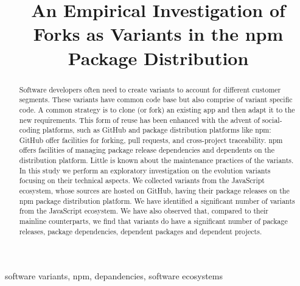 \documentclass[conference]{IEEEtran}
\newcommand{\gh}{\textsf{GitHub}\xspace}
\newcommand{\np}{\textsf{npm}\xspace}
\newcommand{\js}{\textsf{JavaScript}\xspace}
\newcommand{\npm}{{the \np package distribution platform}\xspace}
\begin{document}
\title{An Empirical Investigation of Forks as Variants in the npm Package Distribution}


\author{
	}



\maketitle

\begin{abstract}
Software developers often need to create variants to account for different customer segments. These variants have common code base but also comprise of variant specific code. A common strategy is to clone (or fork) an existing app and then adapt it to the new requirements. This form of reuse has been enhanced with the advent of social-coding platforms, such as \gh and package distribution platforms like \np: \gh offer facilities for forking, pull requests, and cross-project traceability. \np offers facilities of managing package release dependencies and dependents on the distribution platform. Little is known about the maintenance practices of the variants.
In this study we perform an exploratory investigation on the evolution variants focusing on their technical aspects. We collected variants from the \js ecosystem, whose sources are hosted on \gh, having their package releases on \npm. We have identified a significant number of variants from the \js ecosystem. We have also observed that, compared to their mainline counterparts, we find that variants do have a significant number of package releases, package dependencies, dependent packages and dependent projects.

\end{abstract}

\begin{IEEEkeywords}
software variants, npm, depandencies, software ecosystems
\end{IEEEkeywords}













\end{document}
